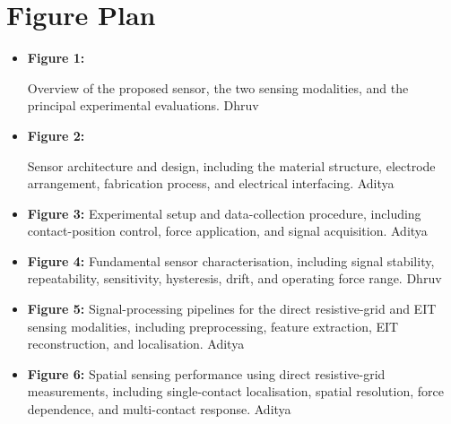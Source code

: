 \section{Figure Plan}
\label{sec:figure-plan}

%

\begin{itemize}
\item \textbf{Figure 1:} 
\begin{figure}
    \centering
    
    \caption{}
    \label{fig:placeholder}
\end{figure}
Overview of the proposed sensor, the two sensing
modalities, and the principal experimental evaluations. Dhruv

\item \textbf{Figure 2:}
\begin{figure}
    \centering
    
    \caption{}
    \label{fig:placeholder}
\end{figure}
Sensor architecture and design, including the
material structure, electrode arrangement, fabrication process, and
electrical interfacing. Aditya 

\item \textbf{Figure 3:} Experimental setup and data-collection procedure,
including contact-position control, force application, and signal
acquisition. Aditya

\item \textbf{Figure 4:} Fundamental sensor characterisation, including
signal stability, repeatability, sensitivity, hysteresis, drift, and
operating force range. Dhruv

\item \textbf{Figure 5:} Signal-processing pipelines for the direct
resistive-grid and EIT sensing modalities, including preprocessing,
feature extraction, EIT reconstruction, and localisation. Aditya

\item \textbf{Figure 6:} Spatial sensing performance using direct
resistive-grid measurements, including single-contact localisation,
spatial resolution, force dependence, and multi-contact response. Aditya


\end{itemize}

